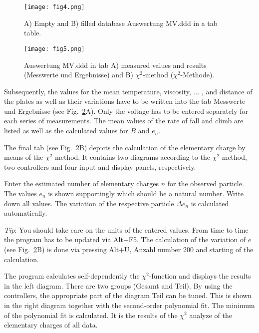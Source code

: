 \documentclass{tudphygp_eng}
\begin{document}
\begin{figure}[t]
\begin{center}
\texttt{[image: fig4.png]} 
\caption{A) Empty and B) filled database \grqq{}Auswertung MV.ddd\grqq{} in a tab table.}
\label{fig4}
\end{center}
\end{figure}

\begin{figure}[t]
\begin{center}
\texttt{[image: fig5.png]} 
\caption{\grqq{}Auswertung MV.ddd\grqq{} in tab A) measured values and results (\grqq{}Messwerte und Ergebnisse\grqq{}) and B) $\chi^2$-method (\grqq{}$\chi^2$-Methode\grqq{}).}
\label{fig5}
\end{center}
\end{figure}

Subsequently, the values for the mean temperature, viscosity, ... , and distance of the plates as well as their variations have to be written into the tab \grqq{}Messwerte und Ergebnisse\grqq{} (see Fig.~\ref{fig5}A). Only the voltage has to be entered separately for each series of measurements. The mean values of the rate of fall and climb are listed as well as the calculated values for $B$ and $e_n$.

The final tab (see Fig.~\ref{fig5}B) depicts the calculation of the elementary charge by means of the $\chi^2$-method. It contains two diagrams according to the $\chi^2$-method, two controllers and four input and display panels, respectively.

Enter the estimated number of elementary charges $n$ for the observed particle. The values $e_n$ is shown supportingly which should be a natural number. Write down all values. The variation of the respective particle ${\Delta}e_n$ is calculated automatically.

\emph{Tip}: You should take care on the units of the entered values. From time to time the program has to be 
updated via \grqq{}Alt+F5\grqq{}. The calculation of the variation of $e$ (see Fig.~\ref{fig5}B) is done via pressing \grqq{}Alt+U\grqq{}, \grqq{}Anzahl\grqq{} number 200 and starting of the calculation.

The program calculates self-dependently the $\chi^2$-function and displays the results in the left diagram. There are two groups (\grqq{}Gesamt\grqq{} and \grqq{}Teil\grqq{}). By using the controllers, the appropriate part of the diagram \grqq{}Teil\grqq{} can be tuned. This is shown in the right diagram together with the second-order polynomial fit. The minimum of the polynomial fit is calculated. It is the results of the $\chi^2$ analyze of the elementary charges of all data.
\end{document}
